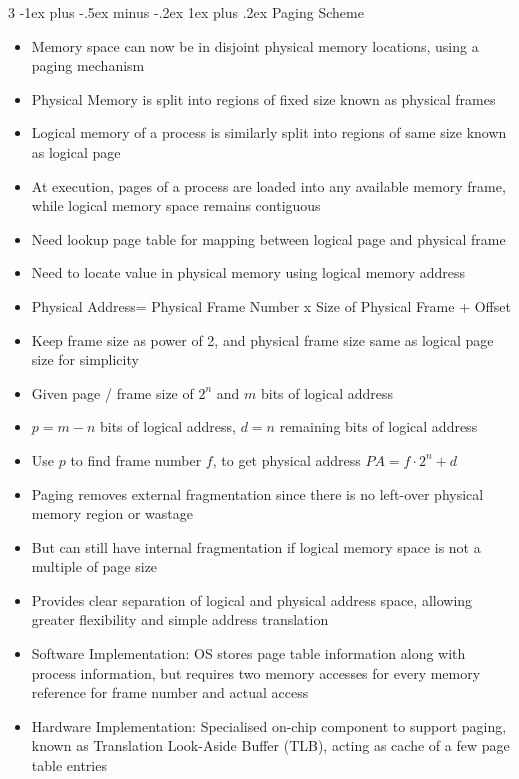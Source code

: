 \documentclass[10pt, landscape]{article}
\makeatletter
\renewcommand{\subsection}{\@startsection{subsection}{3}{0mm}%
                                {-1ex plus -.5ex minus -.2ex}%
                                {1ex plus .2ex}%
                                {\normalfont\small\bfseries}}%
\makeatother
\begin{document}
\begin{multicols*}{3}
\subsection{Paging Scheme}
\begin{itemize}
    \item Memory space can now be in disjoint physical memory locations, using a paging mechanism
    \item Physical Memory is split into regions of fixed size known as physical frames
    \item Logical memory of a process is similarly split into regions of same size known as logical page
    \item At execution, pages of a process are loaded into any available memory frame, while logical memory space remains contiguous
    \item Need lookup page table for mapping between logical page and physical frame
    \item Need to locate value in physical memory using logical memory address
    \item Physical Address= Physical Frame Number x Size of Physical Frame + Offset
    \item Keep frame size as power of 2, and physical frame size same as logical page size for simplicity
    \item Given page / frame size of $2^n$ and $m$ bits of logical address
    \item $p=m-n$ bits of logical address, $d=n$ remaining bits of logical address
    \item Use $p$ to find frame number $f$, to get physical address $PA=f\cdot 2^n+d$
    \item Paging removes external fragmentation since there is no left-over physical memory region or wastage
    \item But can still have internal fragmentation if logical memory space is not a multiple of page size
    \item Provides clear separation of logical and physical address space, allowing greater flexibility and simple address translation
    \item Software Implementation: OS stores page table information along with process information, but requires two memory accesses for every memory reference for frame number and actual access
    \item Hardware Implementation: Specialised on-chip component to support paging, known as Translation Look-Aside Buffer (TLB), acting as cache of a few page table entries

\end{itemize}
\end{multicols*}
\end{document}
